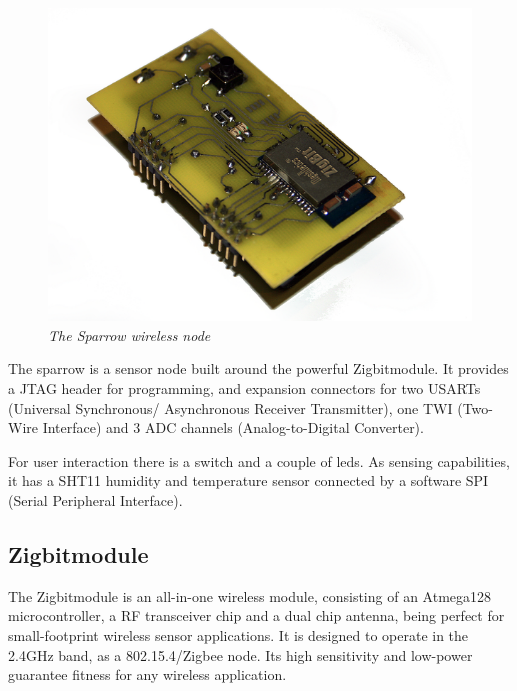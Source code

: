 \begin{figure}[ht]
\begin{center}
\includegraphics[scale=0.5]{hw_platform/sparrow.png}
\end{center}
\caption{\small \itshape{The Sparrow wireless node}}
\end{figure}
The sparrow is a sensor node built around the powerful Zigbit\texttrademark module. It provides a JTAG header for programming,
and expansion connectors for two USARTs (Universal Synchronous/ Asynchronous Receiver Transmitter), one TWI (Two-Wire Interface)
and 3 ADC channels (Analog-to-Digital Converter).



For user interaction there is a switch and a couple of leds. As sensing capabilities, it has a SHT11 humidity and temperature
sensor connected by a software SPI (Serial Peripheral Interface).

\subsection{Zigbit\texttrademark    module}

The Zigbit\texttrademark   module is an all-in-one wireless module, consisting of an Atmega128 microcontroller, a RF 
transceiver chip and a dual chip antenna, being perfect for small-footprint wireless sensor applications. It is designed 
to operate in the 2.4GHz band, as a 802.15.4/Zigbee node. Its high sensitivity and low-power guarantee fitness for any 
wireless application.

